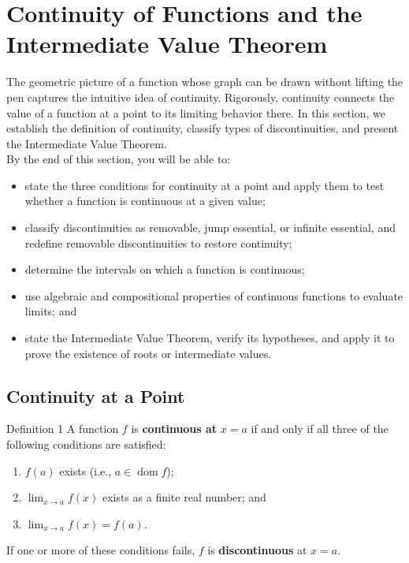 \section{Continuity of Functions and the Intermediate Value Theorem}
\label{sec:1.5}

The geometric picture of a function whose graph can be drawn without lifting the pen captures the intuitive idea of continuity. Rigorously, continuity connects the value of a function at a point to its limiting behavior there. In this section, we establish the definition of continuity, classify types of discontinuities, and present the Intermediate Value Theorem. \\

By the end of this section, you will be able to:
\begin{itemize}
    \item state the three conditions for continuity at a point and apply them to test whether a function is continuous at a given value;
    \item classify discontinuities as removable, jump essential, or infinite essential, and redefine removable discontinuities to restore continuity;
    \item determine the intervals on which a function is continuous;
    \item use algebraic and compositional properties of continuous functions to evaluate limits; and
    \item state the Intermediate Value Theorem, verify its hypotheses, and apply it to prove the existence of roots or intermediate values.
\end{itemize}


\subsection*{Continuity at a Point}
\label{subsec:1.5.1}


\begin{definitionbox}{Definition 1}
A function \(f\) is \textbf{continuous at} \(x = a\) if and only if all three of the following conditions are satisfied:
\begin{enumerate}
    \item \(f(a)\) exists (i.e., \(a \in \operatorname{dom} f\));
    \item \(\displaystyle\lim_{x \to a} f(x)\) exists as a finite real number; and
    \item \(\displaystyle\lim_{x \to a} f(x) = f(a)\).
\end{enumerate}
If one or more of these conditions fails, \(f\) is \textbf{discontinuous} at \(x = a\).
\end{definitionbox}

